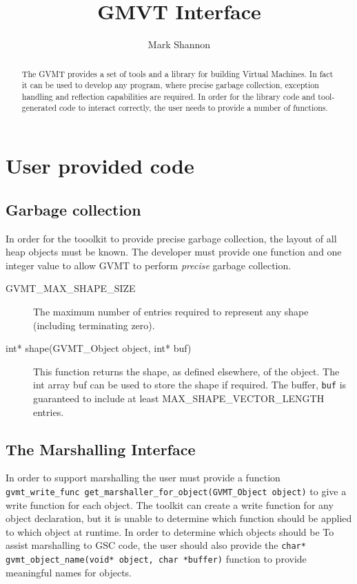 \documentclass[a4paper,10pt]{article}
\title{GMVT Interface}
\author{Mark Shannon}
\date{ }
\begin{document}
\maketitle

\begin{abstract}
The GVMT provides a set of tools and a library for building Virtual Machines. In fact it can be used to develop any program, where precise garbage collection, exception handling and reflection capabilities are required. In order for the library code and tool-generated code to interact correctly, the user needs to provide a number of functions.
\end{abstract}

\section{User provided code}

\subsection{Garbage collection}
In order for the tooolkit to provide precise garbage collection, the layout of all heap objects must be known. The developer must provide one function and one integer value to allow GVMT to perform \emph{precise} garbage collection.
\begin{description}
\item [GVMT\_MAX\_SHAPE\_SIZE] The maximum number of entries required to represent any shape (including terminating zero).
\item [int* shape(GVMT\_Object object, int* buf)] This function returns the shape, as defined elsewhere, of the object. The int array buf can be used to store the shape if required. The buffer, \verb|buf| is guaranteed to include at least MAX\_SHAPE\_VECTOR\_LENGTH entries.
\end{description}


\subsection{The Marshalling Interface}
In order to support marshalling the user must provide a function \\
 \verb|gvmt_write_func get_marshaller_for_object(GVMT_Object object)| to give a write function for each object. The toolkit can create a write function for any object declaration, but it is unable to determine which function should be applied to which object at runtime. In order to determine which objects should be 
To assist marshalling to GSC code, the user should also provide the \verb|char* gvmt_object_name(void* object, char *buffer)| function to provide meaningful names for objects.
\end{document}
